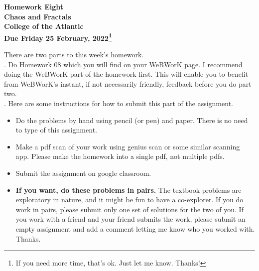 \documentclass[11pt]{article}
\begin{document}
\pagestyle{empty}
 
\begin{center}
{\LARGE {\bf Homework Eight}}\\
\smallskip
{\Large {\bf Chaos and Fractals}}\\
\smallskip
{\Large {\bf College of the Atlantic}}\\
\smallskip
{ {\bf Due Friday 25 February, 2022\footnote{If you need more time,
      that's ok. Just let me know. Thanks!}}}\\  
\end{center}



\noindent There are two parts to this week's homework.\\


.
Do Homework 08 which you will find
on your
\href{https://webwork.runestone.academy/webwork2/coa-feldman-es1026i-winter-2022}{WeBWorK
  page}.  I recommend doing the WeBWorK part of the 
homework first.  This will enable you to benefit from WeBWorK's
instant, if not necessarily friendly, feedback before you do part two.\\


.  Here are some
instructions for how to submit this part of the assignment.
\begin{itemize}
\setlength{\itemsep}{0mm}
\item Do the problems by hand using pencil (or pen) and paper.
  There is no need to type of this assignment.
\item Make a pdf scan of your work using genius scan or some
  similar scanning app.  Please make the homework into a single
  pdf, not multiple pdfs.
\item Submit the assignment on google classroom.
\item {\bf If you want, do these problems in pairs.} The textbook problems 
  are exploratory in nature, and it might be fun to have a co-explorer.
  If you do work in pairs,
  please submit only one set of solutions for the two of you.  If you
  work with a friend and your friend submits the work, please submit
  an empty assignment and add a comment letting me know who you worked
  with.  Thanks.\\
\end{itemize}
\end{document}
